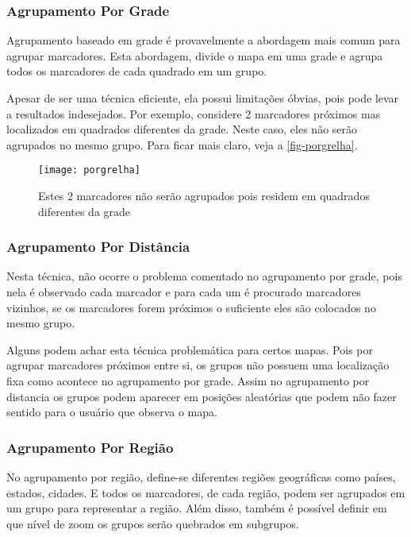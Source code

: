 		\subsubsection{Agrupamento Por Grade}
		Agrupamento baseado em grade é provavelmente a abordagem mais comum para agrupar marcadores. Esta abordagem, divide o mapa em uma grade e agrupa todos os marcadores de cada quadrado em um grupo. 
		
		Apesar de ser uma técnica eficiente, ela possui limitações óbvias, pois pode levar a resultados indesejados. Por exemplo, considere 2 marcadores próximos mas localizados em quadrados diferentes da grade. Neste caso, eles não serão agrupados no mesmo grupo. Para ficar mais claro, veja a \autoref{fig-porgrelha}. 

\begin{figure}[htb]
	\caption{\label{fig-porgrelha}Estes 2 marcadores não serão agrupados pois residem em quadrados diferentes da grade}
	\begin{center}
	    \texttt{[image: porgrelha]}
	\end{center}
\end{figure}

		\subsubsection{Agrupamento Por Distância}
			Nesta técnica, não ocorre o problema comentado no agrupamento por grade, pois nela é observado cada marcador e para cada um é procurado marcadores vizinhos, se os marcadores forem próximos o suficiente eles são colocados no mesmo grupo.
		
			Alguns podem achar esta técnica problemática para certos mapas. Pois por agrupar marcadores próximos entre si, os grupos não possuem uma localização fixa como acontece no agrupamento por grade. Assim no agrupamento por distancia os grupos podem aparecer em posições aleatórias que podem não fazer sentido para o usuário que observa o mapa.

		\subsubsection{Agrupamento Por Região}
			No agrupamento por região, define-se diferentes regiões geográficas como países, estados, cidades. E todos os marcadores, de cada região, podem ser agrupados em um grupo para representar a região. Além disso, também é possível definir em que nível de zoom os grupos serão quebrados em subgrupos. 
			
